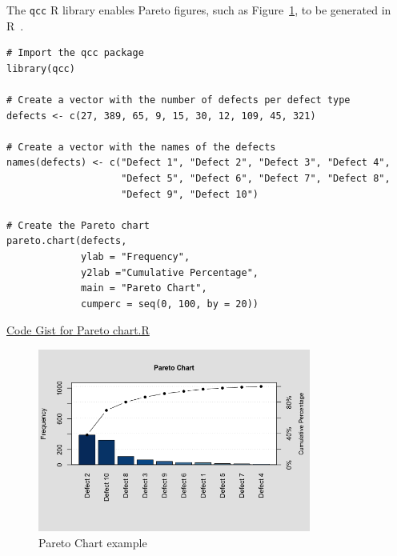 The \texttt{qcc} R library enables Pareto figures, such as Figure~\ref{fig:pareto_chart_example}, to be generated in R~\cite{7_basic_quality_tools_with_R}. 

\begin{lstlisting}
# Import the qcc package
library(qcc)                  

# Create a vector with the number of defects per defect type
defects <- c(27, 389, 65, 9, 15, 30, 12, 109, 45, 321)            

# Create a vector with the names of the defects 
names(defects) <- c("Defect 1", "Defect 2", "Defect 3", "Defect 4",
                    "Defect 5", "Defect 6", "Defect 7", "Defect 8",
                    "Defect 9", "Defect 10")   

# Create the Pareto chart
pareto.chart(defects,
             ylab = "Frequency",
             y2lab ="Cumulative Percentage",
             main = "Pareto Chart",
             cumperc = seq(0, 100, by = 20))
\end{lstlisting}
\href{https://gist.githubusercontent.com/rsalaza4/a69615daba7c7c56290838b46cc121cc/raw/974774009f38d6af534168f2a324ce2b3c61d632/Pareto\%20chart.R}{Code Gist for Pareto chart.R}
\begin{figure}[ht]
    \centering
    \includegraphics[width=0.8\textwidth]{images/Pareto_chart_example.png}
    \caption{Pareto Chart example}
    \label{fig:pareto_chart_example}
\end{figure}

